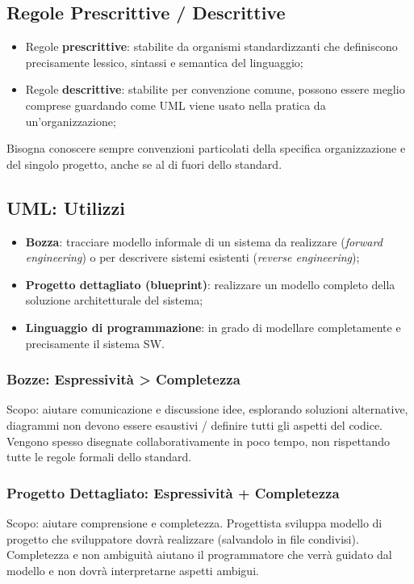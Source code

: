 \documentclass{article}
\begin{document}
    \subsection{Regole Prescrittive / Descrittive}
      \begin{itemize}
        \item Regole \textbf{prescrittive}: stabilite da organismi standardizzanti che definiscono precisamente lessico, sintassi e semantica del linguaggio;
        \item Regole \textbf{descrittive}: stabilite per convenzione comune, possono essere meglio comprese guardando come UML viene usato nella pratica da un'organizzazione;
      \end{itemize}
      Bisogna conoscere sempre convenzioni particolati della specifica organizzazione e del singolo progetto, anche se al di fuori dello standard.
    \subsection{UML: Utilizzi}
      \begin{itemize}
        \item \textbf{Bozza}: tracciare modello informale di un sistema da realizzare (\textit{forward engineering}) o per descrivere sistemi esistenti (\textit{reverse engineering});
        \item \textbf{Progetto dettagliato (blueprint)}: realizzare un modello completo della soluzione architetturale del sistema;
        \item \textbf{Linguaggio di programmazione}: in grado di modellare completamente e precisamente il sistema SW. 
      \end{itemize}
      \subsubsection{Bozze: Espressività > Completezza}
        Scopo: aiutare comunicazione e discussione idee, esplorando soluzioni alternative, diagrammi non devono essere esaustivi / definire tutti gli aspetti del codice. Vengono spesso disegnate collaborativamente in poco tempo, non rispettando tutte le regole formali dello standard. 
      \subsubsection{Progetto Dettagliato: Espressività + Completezza}
        Scopo: aiutare comprensione e completezza. Progettista sviluppa modello di progetto che sviluppatore dovrà realizzare (salvandolo in file condivisi). Completezza e non ambiguità aiutano il programmatore che verrà guidato dal modello e non dovrà interpretarne aspetti ambigui. 
\end{document}
